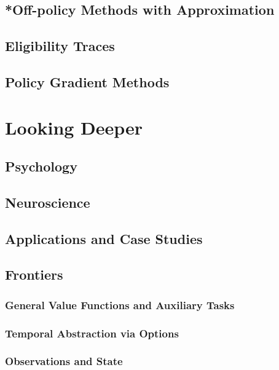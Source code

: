 \documentclass[a4paper,chapter,microtype,fleqn,oneside]{oblivoir}
\begin{document}
\chapter{*Off-policy Methods with Approximation}\label{ch:off-policy-methods-with-approximation}

\chapter{Eligibility Traces}\label{ch:eligibility-traces}

\chapter{Policy Gradient Methods}\label{ch:policy-gradient-methods}

\part{Looking Deeper}\label{pt:looking-deeper}

\chapter{Psychology}\label{ch:psychology}

\chapter{Neuroscience}\label{ch:neuroscience}

\chapter{Applications and Case Studies}\label{ch:applications-and-case-studies}

\chapter{Frontiers}\label{ch:frontiers}
\section{General Value Functions and Auxiliary Tasks}
\section{Temporal Abstraction via Options}
\section{Observations and State}\label{sec:observations-and-state}

\nocite{*}
\printbibliography[title=참고~문헌]
\end{document}
